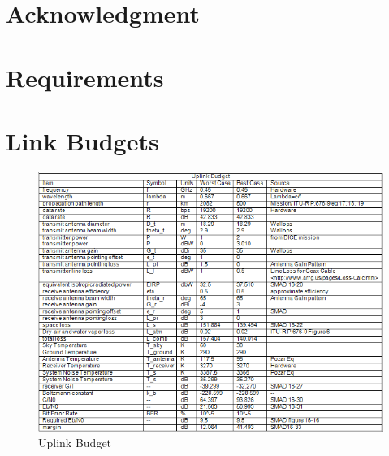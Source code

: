 \documentclass[12pt]{article}
\begin{document}

\section{Acknowledgment}
	
	

\newpage
\appendix
\section{Requirements} \label{app:requirements}




\newpage
\section{Link Budgets} \label{app:link_budgets}

\begin{figure}[ht]
\centering 
\caption{Uplink Budget}
\includegraphics[width=6.5in]{images/comm-uplink-budget}
\end{figure}

\newpage
\noindent
\newline
\end{document}
